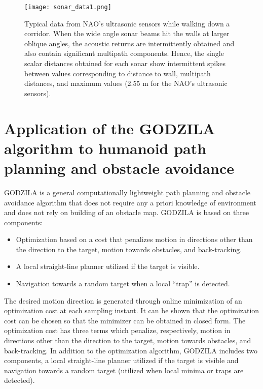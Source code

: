 \documentclass[10pt,conference]{ieeeconf}
\begin{document}
\begin{figure}[!h]
    \vspace*{-0.14in}
  \centerline{\texttt{[image: sonar\_data1.png]}} 
  \caption{Typical data from NAO's ultrasonic sensors while walking down a corridor. When the wide angle sonar beams hit the walls at larger oblique angles, the acoustic returns are intermittently obtained and also contain significant multipath components. Hence, the single scalar distances obtained for each sonar show intermittent spikes between values corresponding to distance to wall, multipath distances, and maximum values (2.55 m for the NAO's ultrasonic sensors).}
    \label{fig:nao_sonar_data}
    \vspace*{-0.12in}
\end{figure}




    \vspace*{-0.03in}
\section{Application of the GODZILA algorithm to humanoid path planning and obstacle avoidance}
\label{oas_sec}
    \vspace*{-0.03in}

GODZILA \cite{KK05b_jirs} is a general computationally lightweight path planning and obstacle
avoidance algorithm that does not require any a priori knowledge of
environment and does not rely on building of an obstacle map.
GODZILA is based on three components:		
\begin{itemize}
\item
Optimization based on a cost that penalizes motion in directions other than the direction to the target, motion towards obstacles, and back-tracking.
\item
A local straight-line planner utilized if the target is visible.
\item
Navigation towards a random target when a local ``trap'' is detected.
\end{itemize}
    The desired motion direction is generated through online minimization of an optimization cost
at each sampling instant.  It can be shown that the optimization cost can
be chosen so that the minimizer can be obtained in closed form.  The
optimization cost has three terms which penalize, respectively, motion
in directions other than the direction to the target, motion towards
obstacles, and back-tracking.  In addition to the optimization
algorithm, GODZILA includes two components,
a local straight-line planner utilized if the target is visible
and  navigation towards a random target (utilized when local minima or traps
are detected). 
\end{document}
